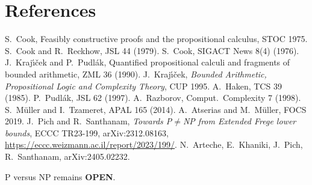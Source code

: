 \documentclass[11pt]{article}
\theoremstyle{remark}
\begin{document}
\section*{References}
S.~Cook, Feasibly constructive proofs and the propositional calculus, STOC 1975.
S.~Cook and R.~Reckhow, JSL 44 (1979).
S.~Cook, SIGACT News 8(4) (1976).
J.~Kraj\'\i\v{c}ek and P.~Pudl\'ak, Quantified propositional calculi and fragments of bounded arithmetic, ZML 36 (1990).
J.~Kraj\'\i\v{c}ek, \emph{Bounded Arithmetic, Propositional Logic and Complexity Theory}, CUP 1995.
A.~Haken, TCS 39 (1985).
P.~Pudl\'ak, JSL 62 (1997).
A.~Razborov, Comput.\ Complexity 7 (1998).
S.~M\"uller and I.~Tzameret, APAL 165 (2014).
A.~Atserias and M.~M\"uller, FOCS 2019.
J.~Pich and R.~Santhanam, \emph{Towards P$\neq$NP from Extended Frege lower bounds}, ECCC TR23-199, arXiv:2312.08163, \url{https://eccc.weizmann.ac.il/report/2023/199/}.
N.~Arteche, E.~Khaniki, J.~Pich, R.~Santhanam, arXiv:2405.02232.

\medskip\noindent P versus NP remains \textbf{OPEN}.
\end{document}
